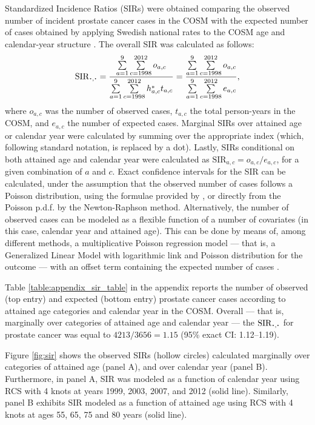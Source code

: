 Standardized Incidence Ratios (SIRs) were obtained comparing the observed number of incident prostate cancer cases in the COSM with the expected number of cases obtained by applying Swedish national rates to the COSM age and calendar-year structure \citep[section~2.3]{breslow_statistical_1987}.  The overall SIR was calculated as follows:
\begin{equation*}
\SIR_{\LargerCdot, \LargerCdot} = \frac{\sum\limits^{9}_{a=1}\sum\limits_{c=1998}^{2012}o_{a,c}}{\sum\limits_{a=1}^{9}\sum\limits_{c=1998}^{2012}h_{a,c}^* t_{a,c}} = \frac{\sum\limits^{9}_{a=1}\sum\limits_{c=1998}^{2012}o_{a,c}}{\sum\limits_{a=1}^{9}\sum\limits_{c=1998}^{2012}e_{a,c}},
\end{equation*}
where $o_{a,c}$ was the number of observed cases, $t_{a,c}$ the total person-years in the COSM, and $e_{a,c}$ the number of expected cases. Marginal SIRs over attained age or calendar year were calculated by summing over the appropriate index (which, following standard notation, is replaced by a dot). Lastly, SIRs conditional on both attained age and calendar year were calculated as $\mathrm{SIR}_{a,c} = o_{a,c}/e_{a,c}$, for a given combination of $a$ and $c$. %
Exact confidence intervals for the SIR can be calculated, under the assumption that the observed number of cases follows a Poisson distribution, using the formulae provided by \citet{ulm_simple_1990}, or directly from the Poisson p.d.f. by the Newton-Raphson method. Alternatively, the number of observed cases can be modeled as a flexible function of a number of covariates (in this case, calendar year and attained age). This can be done by means of, among different methods,  a multiplicative Poisson regression model --- that is, a Generalized Linear Model with logarithmic link and Poisson distribution for the outcome --- with an offset term containing the expected number of cases \citep{berry_analysis_1983, breslow_statistical_1987}.

Table \ref{table:appendix_sir_table} in the appendix reports the number of observed (top entry) and expected (bottom entry) prostate cancer cases according to attained age categories and calendar year in the COSM. Overall --- that is, marginally over categories of attained age and calendar year --- the $\SIR_{\LargerCdot,\LargerCdot}$ for prostate cancer was equal to $4213 / 3656 = 1.15$ (95\% exact CI: 1.12--1.19). 

Figure \ref{fig:sir} shows the observed SIRs (hollow circles) calculated marginally over categories of attained age (panel A), and over calendar year (panel B). Furthermore, in panel A, SIR was modeled as a function of calendar year using RCS with 4 knots at years 1999, 2003, 2007, and 2012 (solid line). Similarly, panel B exhibits SIR modeled as a function of attained age using RCS with 4 knots at ages 55, 65, 75 and 80 years (solid line). 

